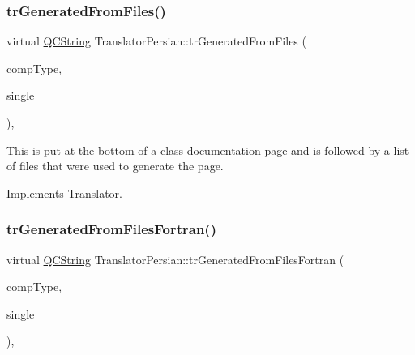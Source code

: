 \mbox{\label{class_translator_persian_a327cf9ca691ef8e92366a68927501dfa}} 
\subsubsection{\texorpdfstring{trGeneratedFromFiles()}{trGeneratedFromFiles()}}
{\footnotesize\ttfamily virtual \mbox{\hyperlink{class_q_c_string}{Q\+C\+String}} Translator\+Persian\+::tr\+Generated\+From\+Files (\begin{DoxyParamCaption}\item[{\mbox{\hyperlink{class_class_def_ae70cf86d35fe954a94c566fbcfc87939}{Class\+Def\+::\+Compound\+Type}}}]{comp\+Type,  }\item[{bool}]{single }\end{DoxyParamCaption})\hspace{0.3cm}{\ttfamily [inline]}, {\ttfamily [virtual]}}

This is put at the bottom of a class documentation page and is followed by a list of files that were used to generate the page. 

Implements \mbox{\hyperlink{class_translator}{Translator}}.

\mbox{\label{class_translator_persian_a8a2a0f314a7b73aafc6b6b56241bbb89}} 
\subsubsection{\texorpdfstring{trGeneratedFromFilesFortran()}{trGeneratedFromFilesFortran()}}
{\footnotesize\ttfamily virtual \mbox{\hyperlink{class_q_c_string}{Q\+C\+String}} Translator\+Persian\+::tr\+Generated\+From\+Files\+Fortran (\begin{DoxyParamCaption}\item[{\mbox{\hyperlink{class_class_def_ae70cf86d35fe954a94c566fbcfc87939}{Class\+Def\+::\+Compound\+Type}}}]{comp\+Type,  }\item[{bool}]{single }\end{DoxyParamCaption})\hspace{0.3cm}{\ttfamily [inline]}, {\ttfamily [virtual]}}

